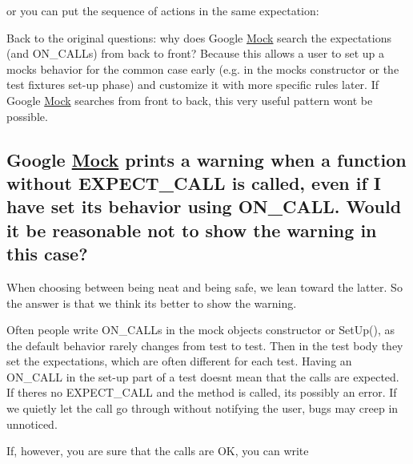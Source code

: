 or you can put the sequence of actions in the same expectation\+:


\begin{DoxyCode}{0}
\end{DoxyCode}


Back to the original questions\+: why does Google \mbox{\hyperlink{class_mock}{Mock}} search the expectations (and {\ttfamily O\+N\+\_\+\+C\+A\+LL}s) from back to front? Because this allows a user to set up a mock\textquotesingle{}s behavior for the common case early (e.\+g. in the mock\textquotesingle{}s constructor or the test fixture\textquotesingle{}s set-\/up phase) and customize it with more specific rules later. If Google \mbox{\hyperlink{class_mock}{Mock}} searches from front to back, this very useful pattern won\textquotesingle{}t be possible.

\subsection*{Google \mbox{\hyperlink{class_mock}{Mock}} prints a warning when a function without E\+X\+P\+E\+C\+T\+\_\+\+C\+A\+LL is called, even if I have set its behavior using O\+N\+\_\+\+C\+A\+LL. Would it be reasonable not to show the warning in this case?}

When choosing between being neat and being safe, we lean toward the latter. So the answer is that we think it\textquotesingle{}s better to show the warning.

Often people write {\ttfamily O\+N\+\_\+\+C\+A\+LL}s in the mock object\textquotesingle{}s constructor or {\ttfamily Set\+Up()}, as the default behavior rarely changes from test to test. Then in the test body they set the expectations, which are often different for each test. Having an {\ttfamily O\+N\+\_\+\+C\+A\+LL} in the set-\/up part of a test doesn\textquotesingle{}t mean that the calls are expected. If there\textquotesingle{}s no {\ttfamily E\+X\+P\+E\+C\+T\+\_\+\+C\+A\+LL} and the method is called, it\textquotesingle{}s possibly an error. If we quietly let the call go through without notifying the user, bugs may creep in unnoticed.

If, however, you are sure that the calls are OK, you can write



